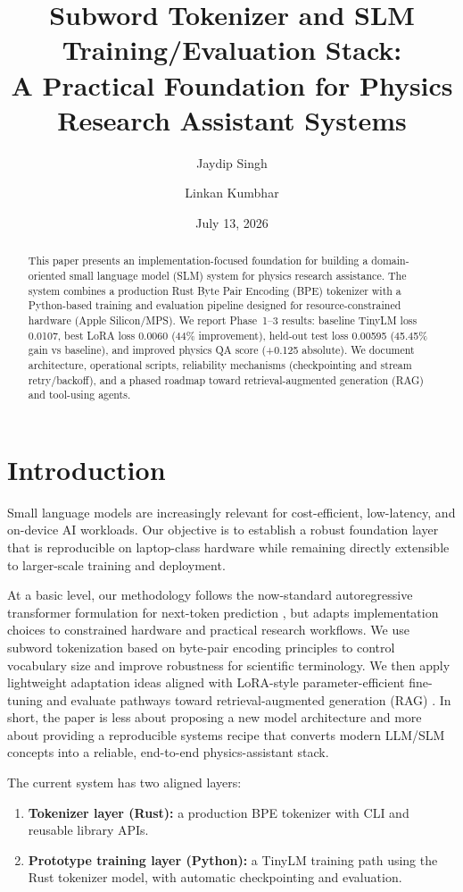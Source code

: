 \documentclass[11pt]{article}
\title{Subword Tokenizer and SLM Training/Evaluation Stack:\\
A Practical Foundation for Physics Research Assistant Systems}
\author{Jaydip Singh \and Linkan Kumbhar}
\date{July 13, 2026}
\begin{document}
\maketitle

\begin{abstract}
This paper presents an implementation-focused foundation for building a domain-oriented small language model (SLM) system for physics research assistance. The system combines a production Rust Byte Pair Encoding (BPE) tokenizer with a Python-based training and evaluation pipeline designed for resource-constrained hardware (Apple Silicon/MPS). We report Phase~1--3 results: baseline TinyLM loss 0.0107, best LoRA loss 0.0060 (44\% improvement), held-out test loss 0.00595 (45.45\% gain vs baseline), and improved physics QA score (+0.125 absolute). We document architecture, operational scripts, reliability mechanisms (checkpointing and stream retry/backoff), and a phased roadmap toward retrieval-augmented generation (RAG) and tool-using agents.
\end{abstract}

\section{Introduction}
Small language models are increasingly relevant for cost-efficient, low-latency, and on-device AI workloads. Our objective is to establish a robust foundation layer that is reproducible on laptop-class hardware while remaining directly extensible to larger-scale training and deployment.

At a basic level, our methodology follows the now-standard autoregressive transformer formulation for next-token prediction \cite{vaswani2017attention}, but adapts implementation choices to constrained hardware and practical research workflows. We use subword tokenization based on byte-pair encoding principles \cite{sennrich2016neural} to control vocabulary size and improve robustness for scientific terminology. We then apply lightweight adaptation ideas aligned with LoRA-style parameter-efficient fine-tuning \cite{hu2021lora} and evaluate pathways toward retrieval-augmented generation (RAG) \cite{lewis2020rag}. In short, the paper is less about proposing a new model architecture and more about providing a reproducible systems recipe that converts modern LLM/SLM concepts into a reliable, end-to-end physics-assistant stack.

The current system has two aligned layers:
\begin{enumerate}[leftmargin=*]
    \item \textbf{Tokenizer layer (Rust):} a production BPE tokenizer with CLI and reusable library APIs.
    \item \textbf{Prototype training layer (Python):} a TinyLM training path using the Rust tokenizer model, with automatic checkpointing and evaluation.
\end{enumerate}
\end{document}
